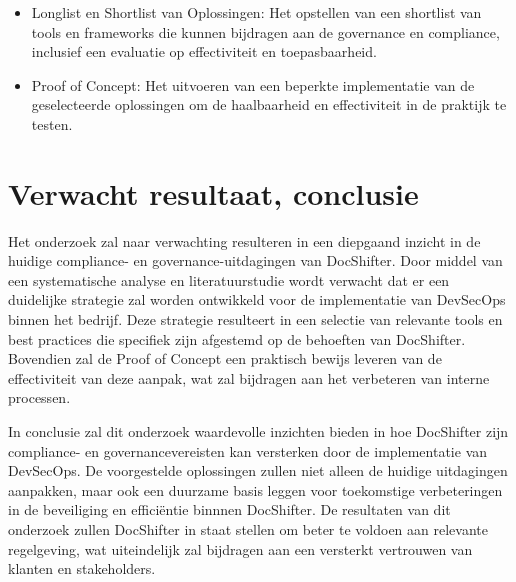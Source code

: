 \documentclass{hogent-article}
\begin{document}
    \begin{itemize}
        \item Longlist en Shortlist van Oplossingen: Het opstellen van een shortlist van tools en frameworks die kunnen bijdragen aan de governance en compliance, inclusief een evaluatie op effectiviteit en toepasbaarheid.
        \item Proof of Concept: Het uitvoeren van een beperkte implementatie van de geselecteerde oplossingen om de haalbaarheid en effectiviteit in de praktijk te testen.
    \end{itemize}
    
    \section{Verwacht resultaat, conclusie}%
    \label{sec:verwachte_resultaten}
    Het onderzoek zal naar verwachting resulteren in een diepgaand inzicht in de huidige compliance- en governance-uitdagingen van DocShifter. Door middel van een systematische analyse en literatuurstudie wordt verwacht dat er een duidelijke strategie zal worden ontwikkeld voor de implementatie van DevSecOps binnen het bedrijf. Deze strategie resulteert in een selectie van relevante tools en best practices die specifiek zijn afgestemd op de behoeften van DocShifter. Bovendien zal de Proof of Concept een praktisch bewijs leveren van de effectiviteit van deze aanpak, wat zal bijdragen aan het verbeteren van interne processen.
    
    In conclusie zal dit onderzoek waardevolle inzichten bieden in hoe DocShifter zijn compliance- en governancevereisten kan versterken door de implementatie van DevSecOps. De voorgestelde oplossingen zullen niet alleen de huidige uitdagingen aanpakken, maar ook een duurzame basis leggen voor toekomstige verbeteringen in de beveiliging en efficiëntie binnnen DocShifter. De resultaten van dit onderzoek zullen DocShifter in staat stellen om beter te voldoen aan relevante regelgeving, wat uiteindelijk zal bijdragen aan een versterkt vertrouwen van klanten en stakeholders.
    
    
         
    
    \printbibliography[heading=bibintoc]
    
\end{document}
